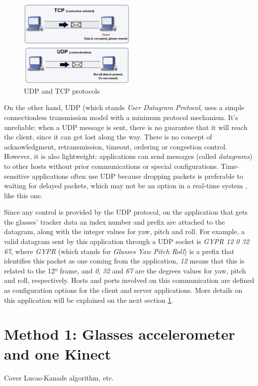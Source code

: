 \documentclass[msc, a4paper, classic, en]{ufbathesis}
\begin{document}
\begin{figure}
\centering
\includegraphics[width=0.5\textwidth]{images/udptcp.png}
\caption{UDP and TCP protocols}
\label{fig:udptcp}
\end{figure}

On the other hand, UDP (which stands \textit{User Datagram Protocol}, uses a simple connectionless transmission model with a minimum protocol mechanism. It's unreliable: when a UDP message is sent, there is no guarantee that it will reach the client, since it can get lost along the way. There is no concept of acknowledgment, retransmission, timeout, ordering or congestion control. However, it is also lightweight: applications can send messages (called \textit{datagrams}) to other hosts without prior communications or special configurations. Time-sensitive applications often use UDP because dropping packets is preferable to waiting for delayed packets, which may not be an option in a real-time system \cite{udp}, like this one.

Since any control is provided by the UDP protocol, on the application that gets the glasses' tracker data an index number and prefix are attached to the datagram, along with the integer values for yaw, pitch and roll. For example, a valid datagram sent by this application through a UDP socket is \textit{GYPR 12 0 32 67}, where \textit{GYPR} (which stands for \textit{Glasses Yaw Pitch Roll}) is a prefix that identifies this packet as one coming from the application, \textit{12} means that this is related to the 12º frame, and \textit{0}, \textit{32} and \textit{67} are the degrees values for yaw, pitch and roll, respectively. Hosts and ports involved on this communication are defined as configuration options for the client and server applications. More details on this application will be explained on the next section \ref{sec:method1}.

\section{Method 1: Glasses accelerometer and one Kinect}
\label{sec:method1}
Cover Lucas-Kanade algorithm, etc.
\end{document}
